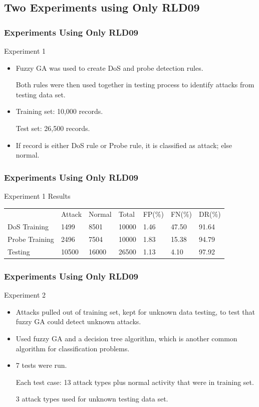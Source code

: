 \documentclass{beamer}
\newcommand{\linespace}{\vskip 0.25cm}
\begin{document}
\subsection{Two Experiments using Only RLD09}
\begin{frame}
	\frametitle{Experiments Using Only RLD09}
	Experiment 1
	\begin{itemize}
		\item Fuzzy GA was used to create DoS and probe detection rules. 
		
		Both rules were then used together in testing process to identify attacks from testing data set.
		
		\linespace
		\linespace
		
		\item Training set: 10,000 records.
		
		Test set: 26,500 records.

		\linespace
		\linespace

		\item If record is either DoS rule or Probe rule, it is classified as attack; else normal.
\end{itemize}
\end{frame}


\begin{frame}
	\frametitle{Experiments Using Only RLD09}
	Experiment 1 Results
\begin{table}
\begin{small}
\begin{tabular}{lllllll}
 & Attack & Normal & Total & FP(\%) & FN(\%) & DR(\%)\\
DoS Training & 1499 & 8501 & 10000 & 1.46 & 47.50 & 91.64\\
Probe Training & 2496 & 7504 & 10000 & 1.83 & 15.38 & 94.79\\
Testing & 10500 & 16000 & 26500 & 1.13 & 4.10 & 97.92\\
\end{tabular}
\end{small}
\end{table}
\end{frame}


\begin{frame}
	\frametitle{Experiments Using Only RLD09}
Experiment 2
	\begin{itemize}
		\item Attacks pulled out of training set, kept for unknown data testing, to test that fuzzy GA could detect unknown attacks.
		\item Used fuzzy GA and a decision tree algorithm, which is another common algorithm for classification problems.
		\item 7 tests were run. 
		
		Each test case: 13 attack types plus normal activity that were in training set. 
		
		3 attack types used for unknown testing data set.
	\end{itemize}
\end{frame}
\end{document}
